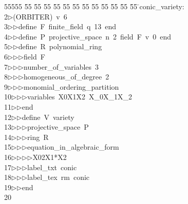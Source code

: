 %
%
\begin{tabbing}
55555 \= 55 \= 55 \= 55 \= 55 \= 55 \= 55 \= 55 \= 55 \= 55 \= 55 \= 55 \= 55 \= \>conic\_variety:\\[0pt]
2\>$\triangleright$\>(ORBITER)\ v\ 6\ \\[0pt]
3\>$\triangleright$\>$\triangleright$\>define\ F\ finite\_field\ q\ 13\ end\ \\[0pt]
4\>$\triangleright$\>$\triangleright$\>define\ P\ projective\_space\ n\ 2\ field\ F\ v\ 0\ end\ \\[0pt]
5\>$\triangleright$\>$\triangleright$\>define\ R\ polynomial\_ring\ \\[0pt]
6\>$\triangleright$\>$\triangleright$\>$\triangleright$\>field\ F\ \\[0pt]
7\>$\triangleright$\>$\triangleright$\>$\triangleright$\>number\_of\_variables\ 3\ \\[0pt]
8\>$\triangleright$\>$\triangleright$\>$\triangleright$\>homogeneous\_of\_degree\ 2\ \\[0pt]
9\>$\triangleright$\>$\triangleright$\>$\triangleright$\>monomial\_ordering\_partition\ \\[0pt]
10\>$\triangleright$\>$\triangleright$\>$\triangleright$\>variables\ X0X1X2\ X\_0X\_1X\_2\ \\[0pt]
11\>$\triangleright$\>$\triangleright$\>end\ \\[0pt]
12\>$\triangleright$\>$\triangleright$\>define\ V\ variety\ \\[0pt]
13\>$\triangleright$\>$\triangleright$\>$\triangleright$\>projective\_space\ P\ \\[0pt]
14\>$\triangleright$\>$\triangleright$\>$\triangleright$\>ring\ R\ \\[0pt]
15\>$\triangleright$\>$\triangleright$\>$\triangleright$\>equation\_in\_algebraic\_form\ \\[0pt]
16\>$\triangleright$\>$\triangleright$\>$\triangleright$\>$\triangleright$\>X02X1*X2\ \\[0pt]
17\>$\triangleright$\>$\triangleright$\>$\triangleright$\>label\_txt\ conic\ \\[0pt]
18\>$\triangleright$\>$\triangleright$\>$\triangleright$\>label\_tex\ rm\ conic\ \\[0pt]
19\>$\triangleright$\>$\triangleright$\>end\\[0pt]
20\>\end{tabbing}
